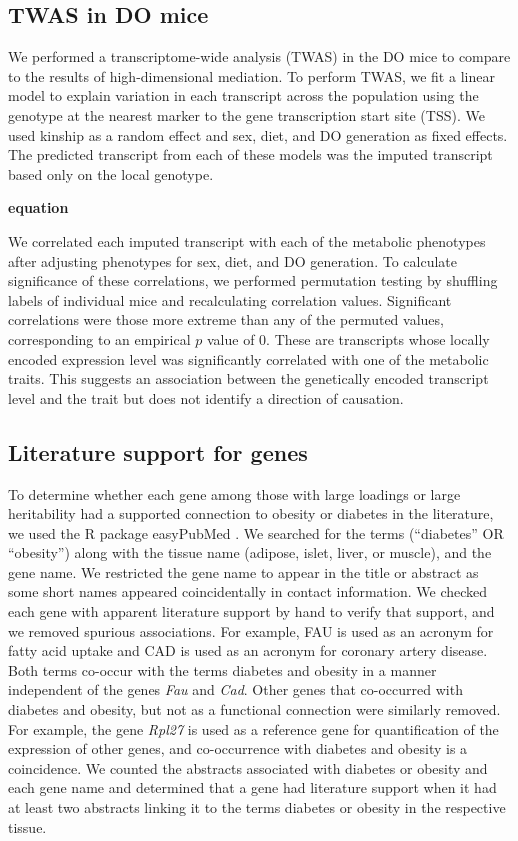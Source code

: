 \documentclass[
]{article}
\begin{document}
\subsection{TWAS in DO mice}\label{twas-in-do-mice}

We performed a transcriptome-wide analysis (TWAS) \cite{pmid26258848, 
pmid26854917} in the DO mice to compare to the results of
high-dimensional mediation. To perform TWAS, we fit a linear model to
explain variation in each transcript across the population using the
genotype at the nearest marker to the gene transcription start site
(TSS). We used kinship as a random effect and sex, diet, and DO
generation as fixed effects. The predicted transcript from each of these
models was the imputed transcript based only on the local genotype.

\textbf{equation}

We correlated each imputed transcript with each of the metabolic
phenotypes after adjusting phenotypes for sex, diet, and DO generation.
To calculate significance of these correlations, we performed
permutation testing by shuffling labels of individual mice and
recalculating correlation values. Significant correlations were those
more extreme than any of the permuted values, corresponding to an
empirical \(p\) value of 0. These are transcripts whose locally encoded
expression level was significantly correlated with one of the metabolic
traits. This suggests an association between the genetically encoded
transcript level and the trait but does not identify a direction of
causation.

\subsection{Literature support for
genes}\label{literature-support-for-genes}

To determine whether each gene among those with large loadings or large
heritability had a supported connection to obesity or diabetes in the
literature, we used the R package easyPubMed \cite{easyPubMed}. We
searched for the terms (``diabetes'' OR ``obesity'') along with the
tissue name (adipose, islet, liver, or muscle), and the gene name. We
restricted the gene name to appear in the title or abstract as some
short names appeared coincidentally in contact information. We checked
each gene with apparent literature support by hand to verify that
support, and we removed spurious associations. For example, FAU is used
as an acronym for fatty acid uptake and CAD is used as an acronym for
coronary artery disease. Both terms co-occur with the terms diabetes and
obesity in a manner independent of the genes \textit{Fau} and
\textit{Cad}. Other genes that co-occurred with diabetes and obesity,
but not as a functional connection were similarly removed. For example,
the gene \textit{Rpl27} is used as a reference gene for quantification
of the expression of other genes, and co-occurrence with diabetes and
obesity is a coincidence. We counted the abstracts associated with
diabetes or obesity and each gene name and determined that a gene had
literature support when it had at least two abstracts linking it to the
terms diabetes or obesity in the respective tissue.
\end{document}
